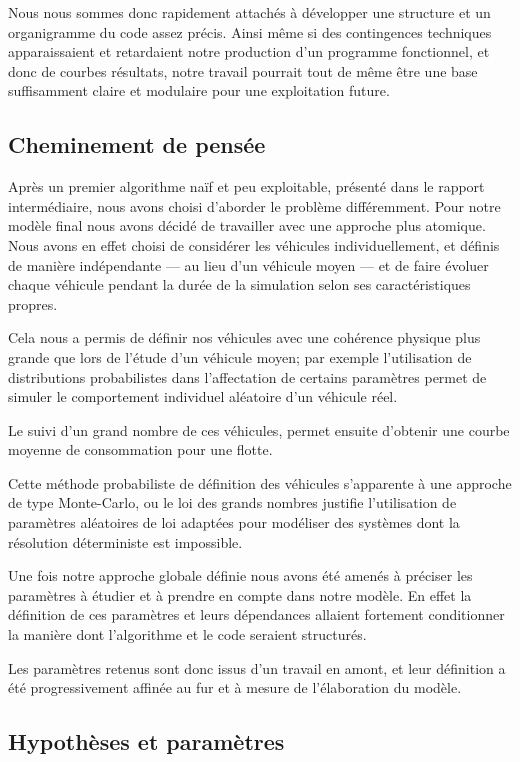 \documentclass[10pt]{article}
\begin{document}
			Nous nous sommes donc rapidement attachés à développer une structure et un organigramme du code assez précis. Ainsi même si des contingences techniques apparaissaient et retardaient notre production d'un programme fonctionnel, et donc de courbes résultats, notre travail pourrait tout de même être une base suffisamment claire et modulaire pour une exploitation future.

	\subsection{Cheminement de pensée}
	
		Après un premier algorithme naïf et peu exploitable, présenté dans le rapport intermédiaire, nous avons choisi d'aborder le problème différemment.
		Pour notre modèle final nous avons décidé de travailler avec une approche plus atomique. Nous avons en effet choisi de considérer les véhicules individuellement, et définis de manière indépendante ---  au lieu d'un véhicule moyen ---  et de faire évoluer chaque véhicule pendant la durée de la simulation selon ses caractéristiques propres.
		
		Cela nous a permis de définir nos véhicules avec une cohérence physique plus grande que lors de l'étude d'un véhicule moyen; par exemple l'utilisation de distributions probabilistes dans l'affectation de certains paramètres permet de simuler le comportement individuel aléatoire d'un véhicule réel.

		Le suivi d'un grand nombre de ces véhicules, permet ensuite d'obtenir une courbe moyenne de consommation pour une flotte.
		
		Cette méthode probabiliste de définition des véhicules s'apparente à une approche de type Monte-Carlo, ou le loi des grands nombres justifie l'utilisation de paramètres aléatoires de loi adaptées pour modéliser des systèmes dont la résolution déterministe est impossible.
		
		Une fois notre approche globale définie nous avons été amenés à préciser les paramètres à étudier et à prendre en compte dans notre modèle. En effet la définition de ces paramètres et leurs dépendances allaient fortement conditionner la manière dont l'algorithme et le code seraient structurés.

		Les paramètres retenus sont donc issus d'un travail en amont, et leur définition a été progressivement affinée au fur et à mesure de l'élaboration du modèle. 

	\subsection{Hypothèses et paramètres}
		
\end{document}

